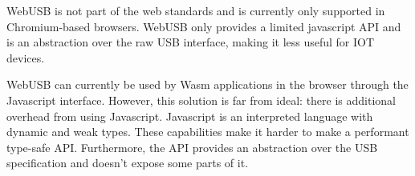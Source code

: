 WebUSB is not part of the web standards and is currently only supported in Chromium-based browsers. WebUSB only provides a limited javascript API and is an abstraction over the raw USB interface, making it less useful for IOT devices.

WebUSB can currently be used by Wasm applications in the browser through the Javascript interface. However, this solution is far from ideal: there is additional overhead from using Javascript. Javascript is an interpreted language with dynamic and weak types. These capabilities make it harder to make a performant type-safe API. Furthermore, the API provides an abstraction over the USB specification and doesn't expose some parts of it.